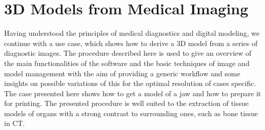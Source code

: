 
\chapter{3D Models from Medical Imaging} %

\label{Chapter4} %
 


Having understood the principles of medical diagnostics and digital modeling, we continue with a use case, which shows how to derive a 3D model from a series of diagnostic images. The procedure described here is used to give an overview of the main functionalities of the software and the basic techniques of image and model management with the aim of providing a generic workflow and some insights on possible variations of this for the optimal resolution of cases specific. \\
The case presented here shows how to get a model of a jaw and how to prepare it for printing. The presented procedure is well suited to the extraction of tissue models of organs with a strong contrast to surrounding ones, such as bone tissue in CT.

